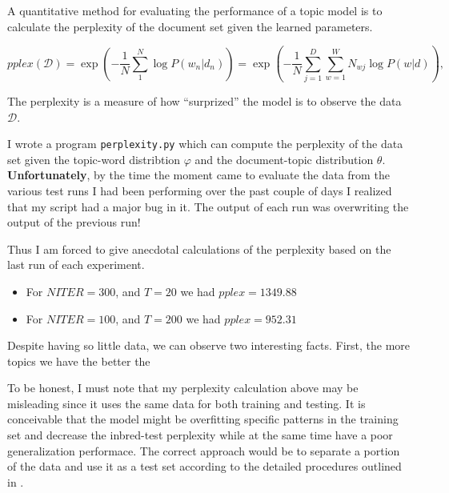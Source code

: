 \documentclass[11pt]{article}
\newcommand{\program}[1]{\texttt{#1}}
\newcommand{\DD}{\mathcal{D}}
\begin{document}
        A quantitative method for evaluating the performance of a topic model 
        is to calculate the perplexity of the document set given the learned parameters.

        \begin{equation}
            pplex\!\left(\DD\right) = \exp\left( - \frac{1}{N} \sum_1^N \log P(w_n|d_n) \right) =
            \exp\left( - \frac{1}{N} \sum_{j=1}^D\sum_{w=1}^W N_{wj}\log P(w|d) \right) ,
        \end{equation}

        The perplexity is a measure of how ``surprized'' the model is to observe the data $\DD$.


        I wrote a program \program{perplexity.py} which can compute the perplexity of the data set
        given the topic-word distribtion $\varphi$ and the document-topic distribution $\theta$.
        {\bf Unfortunately}, by the time the moment came to evaluate the data from the various test
        runs I had been performing over the past couple of days I realized that my script had 
        a major bug in it.
        The output of each run was overwriting the output of the previous run!

        Thus I am forced to give anecdotal calculations of the perplexity based on the last run
        of each experiment. 
        \begin{itemize}
            \item For $NITER=300$, and $T=20$ we had $pplex=1349.88$
            \item For $NITER=100$, and $T=200$ we had $pplex=952.31$
        \end{itemize}

        Despite having so little data, we can observe two interesting facts. 
        First, the more topics we have the better the 

        To be honest, I must note that my perplexity calculation above may be misleading since
        it uses the same data for both training and testing. 
        It is conceivable that the model might be overfitting specific patterns in the training
        set and decrease the inbred-test perplexity while at the same time have a poor
        generalization performace.
        The correct approach would be to separate a portion of the data and use it as a test set
        according to the detailed procedures outlined in \cite{heinrich2005parameter}.
        


	
	
\end{document}
